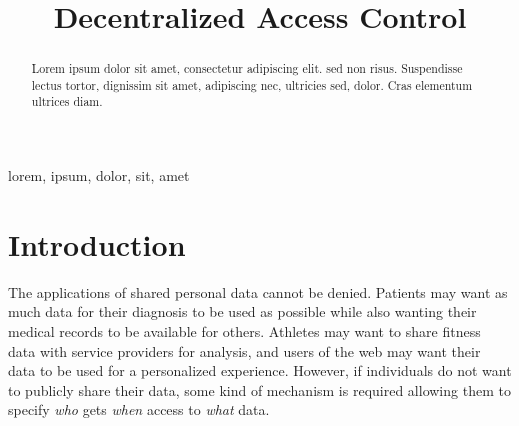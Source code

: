 \documentclass[conference]{IEEEtran}
\begin{document}
\title{Decentralized Access Control}%

\author{
}

\maketitle

\begin{abstract}
  Lorem ipsum dolor sit amet, consectetur adipiscing elit. sed non risus. Suspendisse lectus tortor, dignissim sit amet, adipiscing nec, ultricies sed, dolor. Cras elementum ultrices diam.
\end{abstract}

\begin{IEEEkeywords}
  lorem, ipsum, dolor, sit, amet
\end{IEEEkeywords}

\section{Introduction}

The applications of shared personal data cannot be denied.
Patients may want as much data for their diagnosis to be used as possible while also wanting their medical records to be available for others.
Athletes may want to share fitness data with service providers for analysis, and users of the web may want their data to be used for a personalized experience.
However, if individuals do not want to publicly share their data, some kind of mechanism is required allowing them to specify \textit{who} gets \textit{when} access to \textit{what} data.
\end{document}
